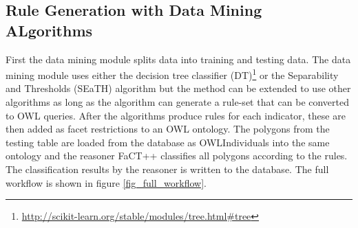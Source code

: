 \documentclass[authoryear, review,12pt,number]{elsarticle}
\begin{document}
\subsection{Rule Generation with Data Mining ALgorithms}
First the data mining module splits data into training and testing data. 
The data mining module uses either the decision tree classifier 
(DT)\footnote{\url{http://scikit-learn.org/stable/modules/tree.html\#tree}} 
\citep{scikit-learn} or the Separability and Thresholds (SEaTH) algorithm
\citep{Nussbaum2006} but the method can be extended to use other algorithms as
long as the algorithm can generate a rule-set that can be converted to OWL
queries. 
After the algorithms produce rules for 
each indicator, these are then added as facet restrictions to an OWL ontology. 
The polygons from the testing table are loaded from the database as
OWLIndividuals into the same ontology and the reasoner FaCT++ classifies all 
polygons according to the rules. The classification results by the reasoner 
is written to the database. The full workflow is shown in figure 
\ref{fig_full_workflow}.
\end{document}
